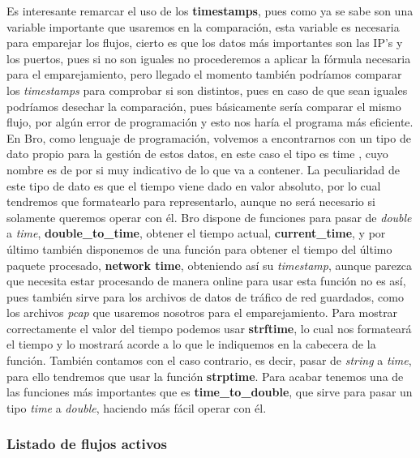 Es interesante remarcar el uso de los \textbf{timestamps}, pues como ya se sabe son una 
variable importante que usaremos en la comparación, esta variable es necesaria para emparejar 
los flujos, cierto es que los datos más importantes son las IP’s y los puertos, 
pues si no son iguales no procederemos a aplicar la fórmula necesaria para el 
emparejamiento, pero llegado el momento también podríamos comparar los \textit{timestamps} 
para comprobar si son distintos, pues en caso de que sean iguales podríamos desechar la 
comparación, pues básicamente sería comparar el mismo flujo, por algún error de programación 
y esto nos haría el programa más eficiente.
\intro
En Bro, como lenguaje de programación, volvemos a encontrarnos con un tipo de 
dato propio para la gestión de estos datos, en este caso el tipo es time \cite{timetype}, 
cuyo nombre es de por si muy indicativo de lo que va a contener. La peculiaridad 
de este tipo de dato es que el tiempo viene dado en valor absoluto, por lo cual 
tendremos que formatearlo para representarlo, aunque no será necesario si solamente 
queremos operar con él. Bro dispone de funciones para pasar de \textit{double} a 
\textit{time}, \textbf{double\_to\_time}, 
obtener el tiempo actual, \textbf{current\_time}, y por último también disponemos de una 
función para obtener el tiempo del último paquete procesado, \textbf{network time}, 
obteniendo así su \textit{timestamp}, aunque parezca que necesita estar procesando de 
manera online para usar esta función no es así, pues también sirve para los 
archivos de datos de tráfico de red guardados, como los archivos \textit{pcap} que 
usaremos nosotros para el emparejamiento. Para mostrar correctamente el valor 
del tiempo podemos usar \textbf{strftime}, lo cual nos formateará el tiempo y lo mostrará 
acorde a lo que le indiquemos en la cabecera de la función. También contamos con el 
caso contrario, es decir, pasar de \textit{string} a \textit{time}, para ello tendremos que usar la 
función \textbf{strptime}.
\intro
Para acabar tenemos una de las funciones más importantes que es \textbf{time\_to\_double}, que sirve para pasar 
un tipo \textit{time} a \textit{double}, haciendo más fácil operar con él.

\subsubsection{Listado de flujos activos}

